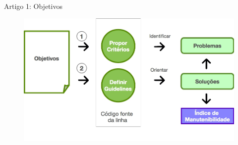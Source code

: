 
\begin{frame}[t, fragile]{Artigo 1: Objetivos}        
  \begin{figure}[hbt]
    \includegraphics[scale=0.4]{imagens/artigo1-objetivos.jpg}
  \end{figure}
\end{frame}